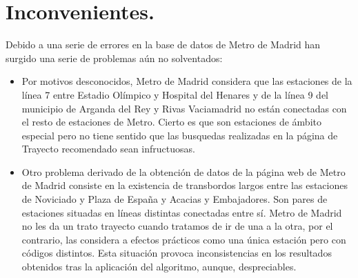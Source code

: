 \documentclass[spanish, a4paper, 12pt] {article}
\begin{document}
\section{Inconvenientes.}
Debido a una serie de errores en la base de datos de Metro de Madrid han surgido una serie de problemas aún no solventados:
\begin{itemize}
\item{
Por motivos desconocidos, Metro de Madrid considera que las estaciones de la línea 7 entre Estadio Olímpico y Hospital del Henares y de la línea 9 del municipio de Arganda del Rey y Rivas Vaciamadrid no están conectadas con el resto de estaciones de Metro. Cierto es que son estaciones de ámbito especial pero no tiene sentido que las busquedas realizadas en la página de Trayecto recomendado sean infructuosas.
}
\item{
Otro problema derivado de la obtención de datos de la página web de Metro de Madrid consiste en la existencia de transbordos largos entre las estaciones de Noviciado y Plaza de España y Acacias y Embajadores. Son pares de estaciones situadas en líneas distintas conectadas entre sí. Metro de Madrid no les da un trato trayecto cuando tratamos de ir de una a la otra, por el contrario, las considera a efectos prácticos como una única estación pero con códigos distintos. Esta situación provoca inconsistencias en los resultados obtenidos tras la aplicación del algoritmo, aunque, despreciables.
}
\end{itemize}
\end{document}
